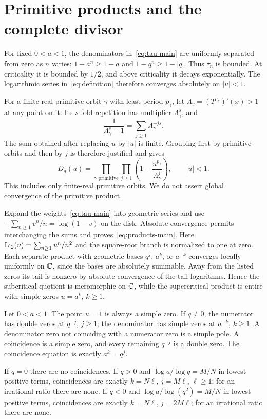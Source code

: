 \section{Primitive products and the complete divisor}\label{sec:products}

For fixed $0<a<1$, the denominators in~\eqref{eq:tau-main} are uniformly
separated from zero as $n$ varies: $1-a^n\ge1-a$ and
$1-q^n\ge1-|q|$. Thus $\tau_n$ is bounded. At criticality it is bounded by
$1/2$, and above criticality it decays exponentially. The logarithmic series
in~\eqref{eq:definition} therefore converges absolutely on $|u|<1$.

For a finite-real primitive orbit $\gamma$ with least period $p_\gamma$, let
$\Lambda_\gamma=(T^{p_\gamma})'(x)>1$ at any point on it. Its $s$-fold
repetition has multiplier $\Lambda_\gamma^s$, and
\begin{equation}\label{eq:geometric-weight}
 \frac1{\Lambda_\gamma^s-1}=\sum_{j\ge1}\Lambda_\gamma^{-js}.
\end{equation}
The sum obtained after replacing $u$ by $|u|$ is finite. Grouping first by
primitive orbits and then by $j$ is therefore justified and gives
\begin{equation}\label{eq:primitive}
 D_a(u)=\prod_{\gamma\text{ primitive}}\prod_{j\ge1}
 \left(1-\frac{u^{p_\gamma}}{\Lambda_\gamma^j}\right),\qquad |u|<1.
\end{equation}
This includes only finite-real primitive orbits. We do not assert global
convergence of the primitive product.

Expand the weights~\eqref{eq:tau-main} into geometric series and use
$-\sum_{n\ge1}v^n/n=\log(1-v)$ on the disk. Absolute convergence permits
interchanging the sums and proves~\eqref{eq:products-main}. Here
$\operatorname{Li}_2(u)=\sum_{n\ge1}u^n/n^2$ and the square-root branch is normalized to one
at zero. Each separate product with geometric bases $q^j$, $a^k$, or $a^{-k}$
converges locally uniformly on $\mathbb C$, since the bases are absolutely summable.
Away from the listed zeros its tail is nonzero by absolute convergence of the
tail logarithms. Hence the subcritical quotient is meromorphic on $\mathbb C$, while
the supercritical product is entire with simple zeros $u=a^k$, $k\ge1$.

\begin{proposition}\label{prop:divisor}
Let $0<a<1$. The point $u=1$ is always a simple zero. If $q\ne0$, the
numerator has double zeros at $q^{-j}$, $j\ge1$; the denominator has simple
zeros at $a^{-k}$, $k\ge1$. A denominator zero not coinciding with a numerator
zero is a simple pole. A coincidence is a simple zero, and every remaining
$q^{-j}$ is a double zero. The coincidence equation is exactly $a^k=q^j$.

If $q=0$ there are no coincidences. If $q>0$ and
$\log a/\log q=M/N$ in lowest positive terms, coincidences are exactly
$k=N\ell$, $j=M\ell$, $\ell\ge1$; for an irrational ratio there are none.
If $q<0$ and $\log a/\log(q^2)=M/N$ in lowest positive terms, coincidences
are exactly $k=N\ell$, $j=2M\ell$; for an irrational ratio there are none.
\end{proposition}

